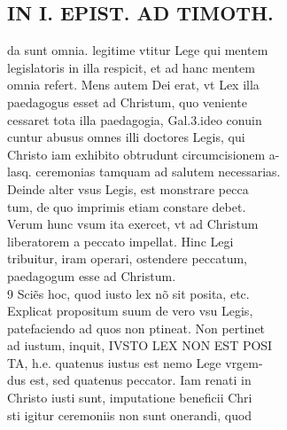 \documentclass{article}
\begin{document}
\begin{pages}
\section*{IN I. EPIST. AD TIMOTH. \\
                }
da sunt omnia. legitime vtitur Lege qui mentem \\
                legislatoris in illa respicit, et ad hanc mentem \\
                omnia refert. Mens autem Dei erat, vt Lex illa \\
                paedagogus esset ad Christum, quo veniente \\
                cessaret tota illa paedagogia, Gal.3.ideo conuin \\
                cuntur abusus omnes illi doctores Legis, qui \\
                Christo iam exhibito obtrudunt circumcisionem a- \\
                lasq. ceremonias tamquam ad salutem necessarias. \\
                Deinde alter vsus Legis, est monstrare pecca \\
                tum, de quo imprimis etiam constare debet. \\
                Verum hunc vsum ita exercet, vt ad Christum \\
                liberatorem a peccato impellat. Hinc Legi \\
                tribuitur, iram operari, ostendere peccatum, \\
                paedagogum esse ad Christum. \\
                9 Sciẽs hoc, quod iusto lex nõ sit posita, etc. \\
                Explicat propositum suum de vero vsu Legis, \\
                patefaciendo ad quos non ptineat. Non pertinet \\
                ad iustum, inquit, IVSTO LEX NON EST POSI \\
                TA, h.e. quatenus iustus est nemo Lege vrgem- \\
                dus est, sed quatenus peccator. Iam renati in \\
                Christo iusti sunt, imputatione beneficii Chri \\
                sti igitur ceremoniis non sunt onerandi, quod \\

\end{pages}
\end{document}
